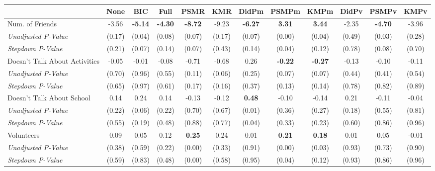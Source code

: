 \begin{tabular}{l c c c c c c c c c c c}
\toprule
 & None & BIC & Full & PSMR & KMR & DidPm & PSMPm & KMPm & DidPv & PSMPv & KMPv \\
\midrule
Num. of Friends & -3.56 & \textbf{ -5.14 } & \textbf{ -4.30 } & \textbf{ -8.72 } & -9.23 & \textbf{ -6.27 } & \textbf{ 3.31 } & \textbf{ 3.44 } & -2.35 & \textbf{ -4.70 } & -3.96 \\
\quad \textit{Unadjusted P-Value} & (0.17) & (0.04) & (0.08) & (0.07) & (0.17) & (0.07) & (0.00) & (0.04) & (0.49) & (0.03) & (0.28) \\
\quad \textit{Stepdown P-Value} & (0.21) & (0.07) & (0.14) & (0.07) & (0.43) & (0.14) & (0.04) & (0.12) & (0.78) & (0.08) & (0.70) \\
Doesn't Talk About Activities & -0.05 & -0.01 & -0.08 & -0.71 & -0.68 & 0.26 & \textbf{ -0.22 } & \textbf{ -0.27 } & -0.13 & -0.10 & -0.11 \\
\quad \textit{Unadjusted P-Value} & (0.70) & (0.96) & (0.55) & (0.11) & (0.06) & (0.25) & (0.07) & (0.07) & (0.44) & (0.41) & (0.54) \\
\quad \textit{Stepdown P-Value} & (0.65) & (0.97) & (0.61) & (0.17) & (0.16) & (0.37) & (0.13) & (0.14) & (0.78) & (0.82) & (0.89) \\
Doesn't Talk About School & 0.14 & 0.24 & 0.14 & -0.13 & -0.12 & \textbf{ 0.48 } & -0.10 & -0.14 & 0.21 & -0.11 & -0.04 \\
\quad \textit{Unadjusted P-Value} & (0.22) & (0.06) & (0.22) & (0.70) & (0.67) & (0.01) & (0.36) & (0.27) & (0.18) & (0.55) & (0.81) \\
\quad \textit{Stepdown P-Value} & (0.55) & (0.19) & (0.48) & (0.88) & (0.77) & (0.04) & (0.33) & (0.23) & (0.60) & (0.86) & (0.96) \\
Volunteers & 0.09 & 0.05 & 0.12 & \textbf{ 0.25 } & 0.24 & 0.01 & \textbf{ 0.21 } & \textbf{ 0.18 } & 0.01 & 0.05 & -0.01 \\
\quad \textit{Unadjusted P-Value} & (0.38) & (0.59) & (0.22) & (0.00) & (0.33) & (0.91) & (0.00) & (0.03) & (0.93) & (0.73) & (0.90) \\
\quad \textit{Stepdown P-Value} & (0.59) & (0.83) & (0.48) & (0.00) & (0.58) & (0.95) & (0.04) & (0.12) & (0.93) & (0.86) & (0.96) \\
\bottomrule
\end{tabular}
